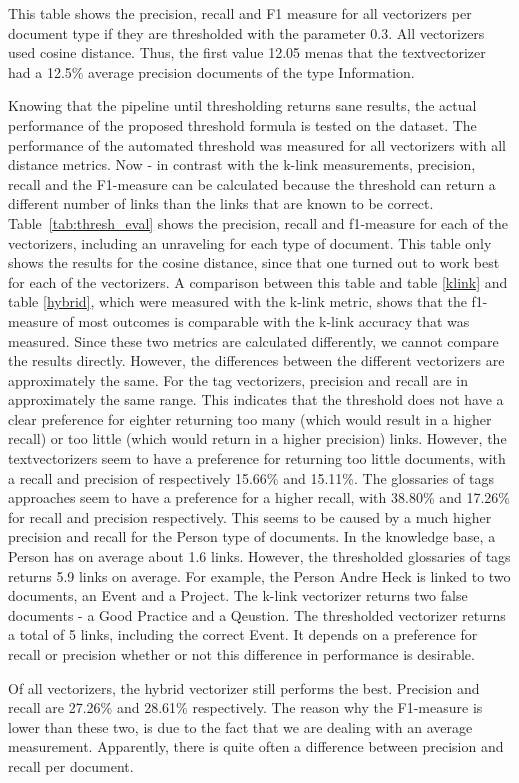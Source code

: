 \begin{table}
\caption{This table shows the precision, recall and F1 measure for all vectorizers per document type if they are thresholded with the parameter 0.3. All vectorizers used cosine distance. Thus, the first value 12.05 menas that the textvectorizer had a 12.5\% average precision documents of the type Information. }
\label{tab:thresh_eval}
\end{table}

Knowing that the pipeline until thresholding returns sane results, the actual performance
of the proposed threshold formula is tested on the dataset. The performance of the 
automated threshold was measured for all vectorizers with all distance metrics. Now - in contrast with the k-link measurements, precision, recall and the F1-measure can be calculated because the threshold can return a different number of links than the links that are known to be correct. Table~\ref{tab:thresh_eval} 
shows the precision, recall and f1-measure for each of the vectorizers, including an unraveling for
each type of document. This table only shows the results for the cosine distance, since that one turned out to work best for each of the vectorizers. A comparison between this table and table \ref{klink} and table \ref{hybrid}, which were measured with the k-link metric, shows that the f1-measure of most outcomes is comparable with the k-link accuracy that was measured. Since these two metrics are calculated differently, we cannot compare the
results directly. However, the differences between the different vectorizers are approximately the same. For the tag vectorizers, precision and recall are in approximately the same range. This indicates that the threshold does not have a clear preference for eighter returning too many (which would result in a higher recall) or too little (which would return in a higher precision) links. However, the textvectorizers seem to have a preference for returning too little documents,  with a recall and precision of respectively 15.66\% and 15.11\%. The glossaries of tags approaches seem to have a preference for a higher recall, with 38.80\% and 17.26\% for recall and precision respectively. This seems to be caused by a much higher precision and recall for the Person type of documents. In the knowledge base, a Person has on average about 1.6 links. However, the thresholded glossaries of tags returns 5.9 links on average. For example, the Person Andre Heck is linked to two documents, an Event and a Project. The k-link vectorizer returns two false documents - a Good Practice and a Qeustion. The thresholded vectorizer returns a total of 5 links, including the correct Event. It depends on a preference for recall or precision whether or not this difference in performance is desirable. 

Of all vectorizers, the hybrid vectorizer still performs the best. Precision and recall are 27.26\% and 28.61\% respectively. The reason why the F1-measure is lower than these two, is due to the fact that we are dealing with an average measurement. Apparently, there is quite often a difference between precision and recall per document. 

\begin{table}

\end{table}
